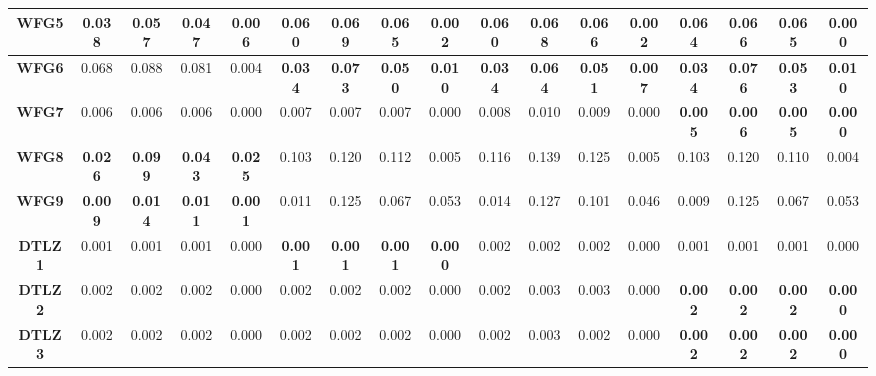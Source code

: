 \begin{table*}[t]
{\begin{tabular}{cc|c|c|c|c|c|c|c|c|c|c|c|c|c|c|c}
\multicolumn{1}{c|}{\textbf{WFG5}}  & \textbf{0.038} & \textbf{0.057} & \textbf{0.047} & \textbf{0.006} & 0.060          & 0.069          & 0.065          & 0.002          & 0.060          & 0.068          & 0.066          & 0.002          & 0.064          & 0.066          & 0.065          & 0.000          \\ \hline
\multicolumn{1}{c|}{\textbf{WFG6}}  & 0.068          & 0.088          & 0.081          & 0.004          & \textbf{0.034} & \textbf{0.073} & \textbf{0.050} & \textbf{0.010} & \textbf{0.034} & \textbf{0.064} & \textbf{0.051} & \textbf{0.007} & \textbf{0.034} & \textbf{0.076} & \textbf{0.053} & \textbf{0.010} \\ \hline
\multicolumn{1}{c|}{\textbf{WFG7}}  & 0.006          & 0.006          & 0.006          & 0.000          & 0.007          & 0.007          & 0.007          & 0.000          & 0.008          & 0.010          & 0.009          & 0.000          & \textbf{0.005} & \textbf{0.006} & \textbf{0.005} & \textbf{0.000} \\ \hline
\multicolumn{1}{c|}{\textbf{WFG8}}  & \textbf{0.026} & \textbf{0.099} & \textbf{0.043} & \textbf{0.025} & 0.103          & 0.120          & 0.112          & 0.005          & 0.116          & 0.139          & 0.125          & 0.005          & 0.103          & 0.120          & 0.110          & 0.004          \\ \hline
\multicolumn{1}{c|}{\textbf{WFG9}}  & \textbf{0.009} & \textbf{0.014} & \textbf{0.011} & \textbf{0.001} & 0.011          & 0.125          & 0.067          & 0.053          & 0.014          & 0.127          & 0.101          & 0.046          & 0.009          & 0.125          & 0.067          & 0.053          \\ \hline
\multicolumn{1}{c|}{\textbf{DTLZ1}} & 0.001          & 0.001          & 0.001          & 0.000          & \textbf{0.001} & \textbf{0.001} & \textbf{0.001} & \textbf{0.000} & 0.002          & 0.002          & 0.002          & 0.000          & 0.001          & 0.001          & 0.001          & 0.000          \\ \hline
\multicolumn{1}{c|}{\textbf{DTLZ2}} & 0.002          & 0.002          & 0.002          & 0.000          & 0.002          & 0.002          & 0.002          & 0.000          & 0.002          & 0.003          & 0.003          & 0.000          & \textbf{0.002} & \textbf{0.002} & \textbf{0.002} & \textbf{0.000} \\ \hline
\multicolumn{1}{c|}{\textbf{DTLZ3}} & 0.002          & 0.002          & 0.002          & 0.000          & 0.002          & 0.002          & 0.002          & 0.000          & 0.002          & 0.003          & 0.002          & 0.000          & \textbf{0.002} & \textbf{0.002} & \textbf{0.002} & \textbf{0.000} \\ \hline

\end{tabular}}
\end{table*}
